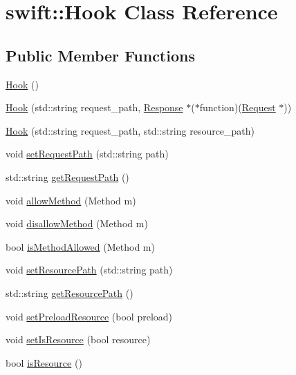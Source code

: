 \hypertarget{classswift_1_1_hook}{\section{swift\-:\-:Hook Class Reference}
\label{classswift_1_1_hook}
}
\subsection*{Public Member Functions}
\begin{DoxyCompactItemize}
\item 
\hyperlink{classswift_1_1_hook_a604d16b8f18f29b83d21f9bed0a22fb2}{Hook} ()
\item 
\hyperlink{classswift_1_1_hook_a8e9f35346f4797a6149a79c7a34235fd}{Hook} (std\-::string request\-\_\-path, \hyperlink{classswift_1_1_response}{Response} $\ast$($\ast$function)(\hyperlink{classswift_1_1_request}{Request} $\ast$))
\item 
\hyperlink{classswift_1_1_hook_a08e8c205418d4dc95a24ad10f0a6754e}{Hook} (std\-::string request\-\_\-path, std\-::string resource\-\_\-path)
\item 
void \hyperlink{classswift_1_1_hook_a047787726165c7b671e88e977468ff5d}{set\-Request\-Path} (std\-::string path)
\item 
std\-::string \hyperlink{classswift_1_1_hook_a4679b1c6977270006156702041180efa}{get\-Request\-Path} ()
\item 
void \hyperlink{classswift_1_1_hook_ab8f2a030f4234be5aaea657628414669}{allow\-Method} (Method m)
\item 
void \hyperlink{classswift_1_1_hook_a02148f71598a14eb8c7f42d9c82f50cb}{disallow\-Method} (Method m)
\item 
bool \hyperlink{classswift_1_1_hook_ad5e71e832b6290d4f195a5dcd594e661}{is\-Method\-Allowed} (Method m)
\item 
void \hyperlink{classswift_1_1_hook_a4147575b0d54691515271508baa428c8}{set\-Resource\-Path} (std\-::string path)
\item 
std\-::string \hyperlink{classswift_1_1_hook_a6754120ec1ace56091e2e794bc9df635}{get\-Resource\-Path} ()
\item 
void \hyperlink{classswift_1_1_hook_a8fc8a844df53bc651a46f9616ee635f9}{set\-Preload\-Resource} (bool preload)
\item 
void \hyperlink{classswift_1_1_hook_aeefe2c2e5080787975097a7c1b431161}{set\-Is\-Resource} (bool resource)
\item 
bool \hyperlink{classswift_1_1_hook_addbf2c39d6628c838b6fb46c96469e31}{is\-Resource} ()

\end{DoxyCompactItemize}
